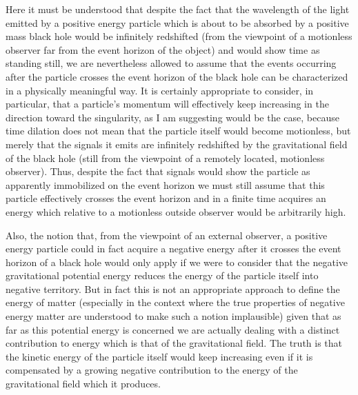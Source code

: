 \documentclass[notitlepage,12pt]{report}
\begin{document}
Here it must be understood that despite the fact that the wavelength of the light emitted by a positive energy particle which is about to be absorbed by a positive mass black hole would be infinitely redshifted (from the viewpoint of a motionless observer far from the event horizon of the object) and would show time as standing still, we are nevertheless allowed to assume that the events occurring after the particle crosses the event horizon of the black hole can be characterized in a physically meaningful way. It is certainly appropriate to consider, in particular, that a particle's momentum will effectively keep increasing in the direction toward the singularity, as I am suggesting would be the case, because time dilation does not mean that the particle itself would become motionless, but merely that the signals it emits are infinitely redshifted by the gravitational field of the black hole (still from the viewpoint of a remotely located, motionless observer). Thus, despite the fact that signals would show the particle as apparently immobilized on the event horizon we must still assume that this particle effectively crosses the event horizon and in a finite time acquires an energy which relative to a motionless outside observer would be arbitrarily high.

Also, the notion that, from the viewpoint of an external observer, a positive energy particle could in fact acquire a negative energy after it crosses the event horizon of a black hole would only apply if we were to consider that the negative gravitational potential energy reduces the energy of the particle itself into negative territory. But in fact this is not an appropriate approach to define the energy of matter (especially in the context where the true properties of negative energy matter are understood to make such a notion implausible) given that as far as this potential energy is concerned we are actually dealing with a distinct contribution to energy which is that of the gravitational field. The truth is that the kinetic energy of the particle itself would keep increasing even if it is compensated by a growing negative contribution to the energy of the gravitational field which it produces.
\end{document}
